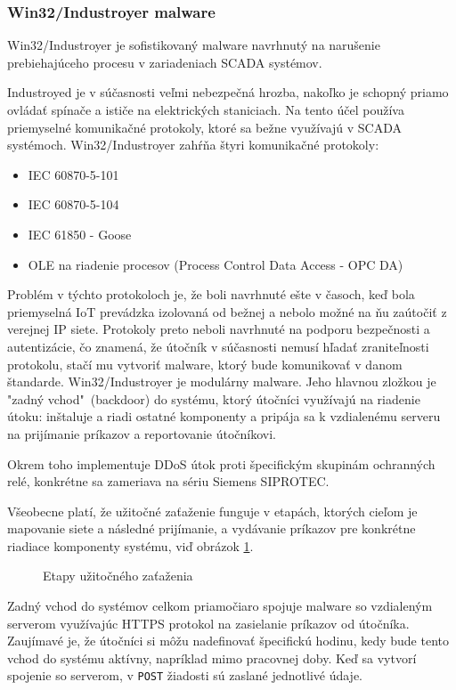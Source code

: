 \subsubsection{Win32/Industroyer malware}
\tab Win32/Industroyer je sofistikovaný malware navrhnutý na narušenie prebiehajúceho procesu v zariadeniach SCADA systémov. \par
Industroyed je v súčasnosti veľmi nebezpečná hrozba, nakoľko je schopný priamo ovládať spínače a ističe na elektrických staniciach. Na tento účel používa priemyselné komunikačné protokoly, ktoré sa bežne využívajú v SCADA systémoch. Win32/Industroyer zahŕňa štyri komunikačné protokoly:
\begin{itemize}
\item IEC 60870-5-101
\item IEC 60870-5-104
\item IEC 61850 - Goose
\item OLE na riadenie procesov (Process Control Data Access - OPC DA)
\end{itemize}
Problém v týchto protokoloch je, že boli navrhnuté ešte v časoch, keď bola priemyselná IoT prevádzka izolovaná od bežnej a nebolo možné na ňu zaútočiť z verejnej IP siete. Protokoly preto neboli navrhnuté na podporu bezpečnosti a autentizácie, čo znamená, že útočník v súčasnosti nemusí hľadať zraniteľnosti protokolu, stačí mu vytvoriť malware, ktorý bude komunikovať v danom štandarde. Win32/Industroyer je modulárny malware. Jeho hlavnou zložkou je "zadný vchod"\ (backdoor) do systému, ktorý útočníci využívajú na riadenie útoku: inštaluje a riadi ostatné komponenty a pripája sa k vzdialenému serveru na prijímanie príkazov a reportovanie útočníkovi. \par
Okrem toho implementuje DDoS útok proti špecifickým skupinám ochranných relé, konkrétne sa zameriava na sériu Siemens SIPROTEC. \par
Všeobecne platí, že užitočné zaťaženie funguje v etapách, ktorých cieľom je mapovanie siete a následné prijímanie, a vydávanie príkazov pre konkrétne riadiace komponenty systému, viď obrázok \ref{payload}. \par
\begin{figure}[h]
    \centering
    \caption{Etapy užitočného zaťaženia\cite{IoTSec}}
\label{payload}
\end{figure}
Zadný vchod do systémov celkom priamočiaro spojuje malware so vzdialeným serverom využívajúc HTTPS protokol na zasielanie príkazov od útočníka. Zaujímavé je, že útočníci si môžu nadefinovať špecifickú hodinu, kedy bude tento vchod do systému aktívny, napríklad mimo pracovnej doby. Keď sa vytvorí spojenie so serverom, v {\tt POST} žiadosti sú zaslané jednotlivé údaje\cite{IoTSec}. \par
